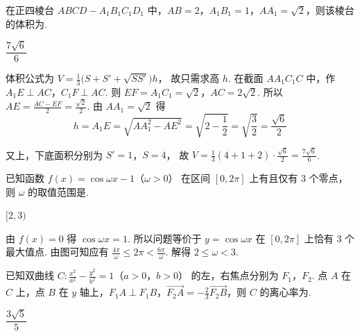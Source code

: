 \begin{problem}
在正四棱台 \(ABCD-A_1B_1C_1D_1\) 中，\(AB=2\)，\(A_1B_1=1\)，\(AA_1=\sqrt2\)，则该棱台的体积为\fillinblank{}.
\end{problem}

\begin{answer}
\(\dfrac{7\sqrt6}{6}\)
\end{answer}

\begin{solution}
体积公式为
\(V=\frac13\bigl(S+S'+\sqrt{SS'}\bigr)h\)，
故只需求高 \(h\).
在截面 \(AA_1C_1C\) 中，作 \(A_1E\perp AC\)，\(C_1F\perp AC\). 则
\(EF=A_1C_1=\sqrt2\)，\(AC=2\sqrt2\).
所以
\(AE=\frac{AC-EF}{2}=\frac{\sqrt2}{2}\).
由 \(AA_1=\sqrt2\) 得
\[
h=A_1E=\sqrt{AA_1^2-AE^2}=\sqrt{2-\frac12}=\sqrt{\frac32}=\frac{\sqrt6}{2}
\]


又上，下底面积分别为
\(S'=1\)，\(S=4\)，
故
\(V=\frac13(4+1+2)\cdot\frac{\sqrt6}{2} =\frac{7\sqrt6}{6}\).
\end{solution}

\begin{problem}
已知函数 \(f(x)=\cos\omega x-1\)（\(\omega>0\)） 在区间 \([0,2\pi]\) 上有且仅有 \(3\) 个零点，则 \(\omega\) 的取值范围是\fillinblank{}.
\end{problem}

\begin{answer}
\([2,3)\)
\end{answer}

\begin{solution}
由 \(f(x)=0\) 得
\(\cos\omega x=1\).
所以问题等价于 \(y=\cos\omega x\) 在 \([0,2\pi]\) 上恰有 \(3\) 个最大值点. 由图可知应有
\(\frac{4\pi}{\omega}\le 2\pi<\frac{6\pi}{\omega}\).
解得
\(2\le \omega<3\).

\end{solution}

\begin{problem}
已知双曲线 \(C:\frac{x^2}{a^2}-\frac{y^2}{b^2}=1\)（\(a>0\)，\(b>0\)） 的左，右焦点分别为 \(F_1\)，\(F_2\). 点 \(A\) 在 \(C\) 上，点 \(B\) 在 \(y\) 轴上，\(F_1A\perp F_1B\)，\(\overrightarrow{F_2A}=-\frac23\overrightarrow{F_2B}\)，则 \(C\) 的离心率为\fillinblank{}.
\end{problem}

\begin{answer}
\(\dfrac{3\sqrt5}{5}\)
\end{answer}

